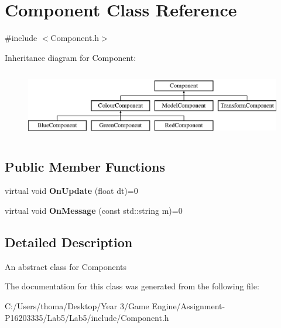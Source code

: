 \hypertarget{class_component}{}\section{Component Class Reference}
\label{class_component}


{\ttfamily \#include $<$Component.\+h$>$}

Inheritance diagram for Component\+:\begin{figure}[H]
\begin{center}
\leavevmode
\includegraphics[height=3.000000cm]{class_component}
\end{center}
\end{figure}
\subsection*{Public Member Functions}
\begin{DoxyCompactItemize}
\item 
\mbox{\label{class_component_ab71d7f4b6d8792287a9b0c9e045acbe0}} 
virtual void {\bfseries On\+Update} (float dt)=0
\item 
\mbox{\label{class_component_a1a880fe5e212cd7ef8241e220660417d}} 
virtual void {\bfseries On\+Message} (const std\+::string m)=0
\end{DoxyCompactItemize}


\subsection{Detailed Description}
An abstract class for Components 

The documentation for this class was generated from the following file\+:\begin{DoxyCompactItemize}
\item 
C\+:/\+Users/thoma/\+Desktop/\+Year 3/\+Game Engine/\+Assignment-\/\+P16203335/\+Lab5/\+Lab5/include/Component.\+h\end{DoxyCompactItemize}
